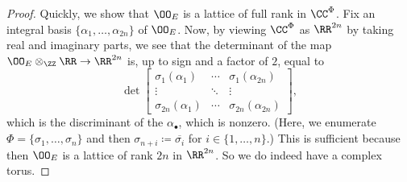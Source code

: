 \documentclass[../notes.tex]{subfiles}
\begin{document}
\begin{proof}
	Quickly, we show that $\OO_E$ is a lattice of full rank in $\CC^\Phi$. Fix an integral basis $\{\alpha_1,\ldots,\alpha_{2n}\}$ of $\OO_E$. Now, by viewing $\CC^\Phi$ as $\RR^{2n}$ by taking real and imaginary parts, we see that the determinant of the map $\OO_E\otimes_\ZZ\RR\to\RR^{2n}$ is, up to sign and a factor of $2$, equal to
	\[\det\begin{bmatrix}
		\sigma_1(\alpha_1) & \cdots & \sigma_{1}(\alpha_{2n}) \\
		\vdots & \ddots & \vdots \\
		\sigma_{2n}(\alpha_1) & \cdots & \sigma_{2n}(\alpha_{2n})
	\end{bmatrix},\]
	which is the discriminant of the $\alpha_\bullet$, which is nonzero. (Here, we enumerate $\Phi=\{\sigma_1,\ldots,\sigma_n\}$ and then $\sigma_{n+i}\coloneqq\overline{\sigma_i}$ for $i\in\{1,\ldots,n\}$.) This is sufficient because then $\OO_E$ is a lattice of rank $2n$ in $\RR^{2n}$. So we do indeed have a complex torus.


\end{proof}
\end{document}
